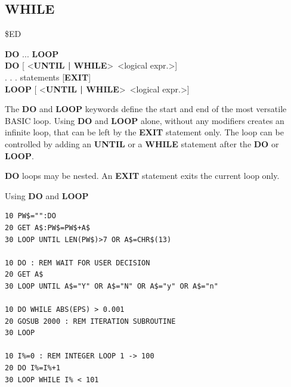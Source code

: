 \subsection{WHILE}
\begin{description}[leftmargin=2cm,style=nextline]
\item [Token:] \$ED
\item [Format:] {\bf DO} ... {\bf LOOP} \\
                {\bf DO} [ <{\bf UNTIL | WHILE}> <logical expr.>] \\
                . . . statements [{\bf EXIT}] \\
                {\bf LOOP} [ <{\bf UNTIL | WHILE}> <logical expr.>]
\item [Usage:] The {\bf DO} and {\bf LOOP} keywords define
               the start and end of the most versatile BASIC loop.
               Using {\bf DO} and {\bf LOOP} alone, without any
               modifiers creates an infinite loop, that can be left
               by the {\bf EXIT} statement only. The loop can be
               controlled by adding an {\bf UNTIL} or a {\bf WHILE}
               statement after the {\bf DO} or {\bf LOOP}.

\item [Remarks:] {\bf DO} loops may be nested. An {\bf EXIT} statement
               exits the current loop only.
\item [Example:] Using {\bf DO} and {\bf LOOP}
\begin{tcolorbox}[colback=black,coltext=white]
\verbatimfont{\codefont}
\begin{verbatim}
10 PW$="":DO
20 GET A$:PW$=PW$+A$
30 LOOP UNTIL LEN(PW$)>7 OR A$=CHR$(13)

10 DO : REM WAIT FOR USER DECISION
20 GET A$
30 LOOP UNTIL A$="Y" OR A$="N" OR A$="y" OR A$="n"

10 DO WHILE ABS(EPS) > 0.001
20 GOSUB 2000 : REM ITERATION SUBROUTINE
30 LOOP

10 I%=0 : REM INTEGER LOOP 1 -> 100
20 DO I%=I%+1
30 LOOP WHILE I% < 101
\end{verbatim}
\end{tcolorbox}
\end{description}


\newpage
